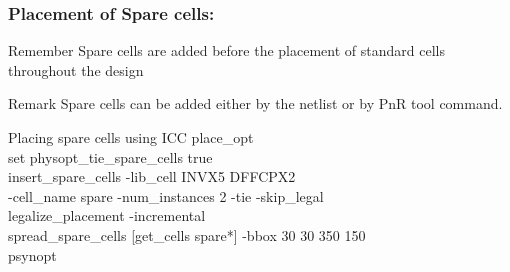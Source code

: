 \documentclass{beamer}
\begin{document}
\begin{frame}
	\frametitle{Placement of Spare cells:}
	\begin{block}{Remember}
		Spare cells are added before the placement of standard cells throughout the design
	\end{block}
	
	\begin{alertblock}{Remark}
		Spare cells can be added either by the netlist or by PnR tool command.
	\end{alertblock}
	\begin{block}{Placing spare cells using ICC}
	place\_opt \\
	set physopt\_tie\_spare\_cells true \\
	insert\_spare\_cells -lib\_cell {INVX5 DFFCPX2 }\ \\
	\quad \quad -cell\_name spare -num\_instances 2 -tie -skip\_legal \\
	legalize\_placement -incremental \\
	spread\_spare\_cells [get\_cells spare*] -bbox {{30 30} {350 150}} \\
	psynopt
\end{block}
\end{frame}	
\end{document}
